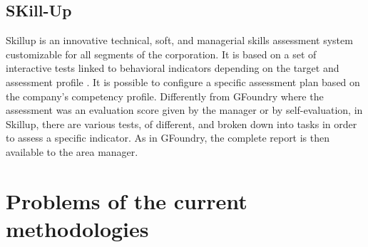 \subsection{SKill-Up}
\label{sec:skillup}

Skillup is an innovative technical, soft, and managerial skills assessment system customizable for all segments of the corporation. It is based on a set of interactive tests linked to behavioral indicators depending on the target and assessment profile \cite{skillup}.
It is possible to configure a specific assessment plan based on the company's competency profile. Differently from GFoundry where the assessment was an evaluation score given by the manager or by self-evaluation, in Skillup, there are various tests, of different, and broken down into tasks in order to assess a specific indicator. As in GFoundry, the complete report is then available to the area manager.

\section{Problems of the current methodologies}


